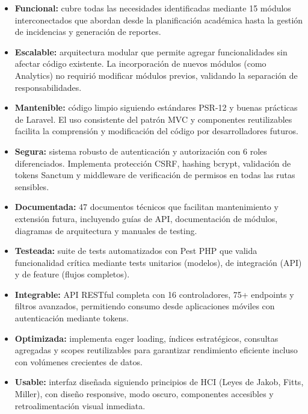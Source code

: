 \begin{itemize}
    \item \textbf{Funcional:} cubre todas las necesidades identificadas mediante 15 módulos interconectados que abordan desde la planificación académica hasta la gestión de incidencias y generación de reportes.
    
    \item \textbf{Escalable:} arquitectura modular que permite agregar funcionalidades sin afectar código existente. La incorporación de nuevos módulos (como Analytics) no requirió modificar módulos previos, validando la separación de responsabilidades.
    
    \item \textbf{Mantenible:} código limpio siguiendo estándares PSR-12 y buenas prácticas de Laravel. El uso consistente del patrón MVC y componentes reutilizables facilita la comprensión y modificación del código por desarrolladores futuros.
    
    \item \textbf{Segura:} sistema robusto de autenticación y autorización con 6 roles diferenciados. Implementa protección CSRF, hashing bcrypt, validación de tokens Sanctum y middleware de verificación de permisos en todas las rutas sensibles.
    
    \item \textbf{Documentada:} 47 documentos técnicos que facilitan mantenimiento y extensión futura, incluyendo guías de API, documentación de módulos, diagramas de arquitectura y manuales de testing.
    
    \item \textbf{Testeada:} suite de tests automatizados con Pest PHP que valida funcionalidad crítica mediante tests unitarios (modelos), de integración (API) y de feature (flujos completos).
    
    \item \textbf{Integrable:} API RESTful completa con 16 controladores, 75+ endpoints y filtros avanzados, permitiendo consumo desde aplicaciones móviles con autenticación mediante tokens.
    
    \item \textbf{Optimizada:} implementa eager loading, índices estratégicos, consultas agregadas y scopes reutilizables para garantizar rendimiento eficiente incluso con volúmenes crecientes de datos.
    
    \item \textbf{Usable:} interfaz diseñada siguiendo principios de HCI (Leyes de Jakob, Fitts, Miller), con diseño responsive, modo oscuro, componentes accesibles y retroalimentación visual inmediata.
\end{itemize}

